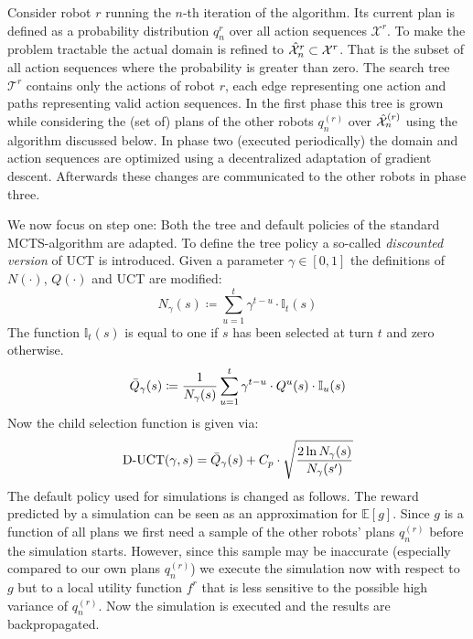 Consider robot $r$ running the $n$-th iteration of the algorithm. Its current plan is defined as a probability distribution $q^r_n$ over all action sequences $\mathcal{X}^r$. To make the problem tractable the actual domain is refined to $\Hat{\mathcal{X}}^r_n \subset \mathcal{X}^r$. That is the subset of all action sequences where the probability is greater than zero. The search tree $\mathcal{T}^r$ contains only the actions of robot $r$, each edge representing one action and paths representing valid action sequences. In the first phase this tree is grown while considering the (set of) plans of the other robots $q_n^{(r)}$ over $\Hat{\mathcal{X}}_n^{(r)}$ using the algorithm discussed below. In phase two (executed periodically) the domain and action sequences are optimized using a decentralized adaptation of gradient descent. Afterwards these changes are communicated to the other robots in phase three.

We now focus on step one: Both the tree and default policies of the standard MCTS-algorithm are adapted. To define the tree policy a so-called \textit{discounted version} of UCT is introduced. Given a parameter $\gamma \in [0,1]$ the definitions of $N(\cdot)$, $Q(\cdot)$ and UCT are modified:
\begin{equation*}
    N_\gamma(s) \coloneqq \sum_{u = 1}^t \gamma^{t-u} \cdot \mathbb{I}_t(s)
\end{equation*}
The function $\mathbb{I}_t(s)$ is equal to one if $s$ has been selected at turn $t$ and zero otherwise.
\begin{equation*}
    \Bar{Q}_\gamma(s) \coloneqq \frac{1}{N_\gamma(s)}\sum_{u = 1}^t  \gamma^{t-u} \cdot Q^u(s) \cdot \mathbb{I}_u(s)
\end{equation*}
Now the child selection function is given via:
\begin{equation*}
    \text{D-UCT}(\gamma,s) =  \Bar{Q}_\gamma(s) + C_p \cdot \sqrt{\frac{2 \ln N_\gamma(s)}{N_\gamma(s')}}
\end{equation*}
The default policy used for simulations is changed as follows. The reward predicted by a simulation can be seen as an approximation for $\mathbb{E}[g]$. Since $g$ is a function of all plans we first need a sample of the other robots' plans $q_n^{(r)}$ before the simulation starts. However, since this sample may be inaccurate (especially compared to our own plans $q_n^{(r)}$) we execute the simulation now with respect to $g$ but to a local utility function $f
^r$ that is less sensitive to the possible high variance of $q_n^{(r)}$. Now the simulation is executed and the results are backpropagated.   
